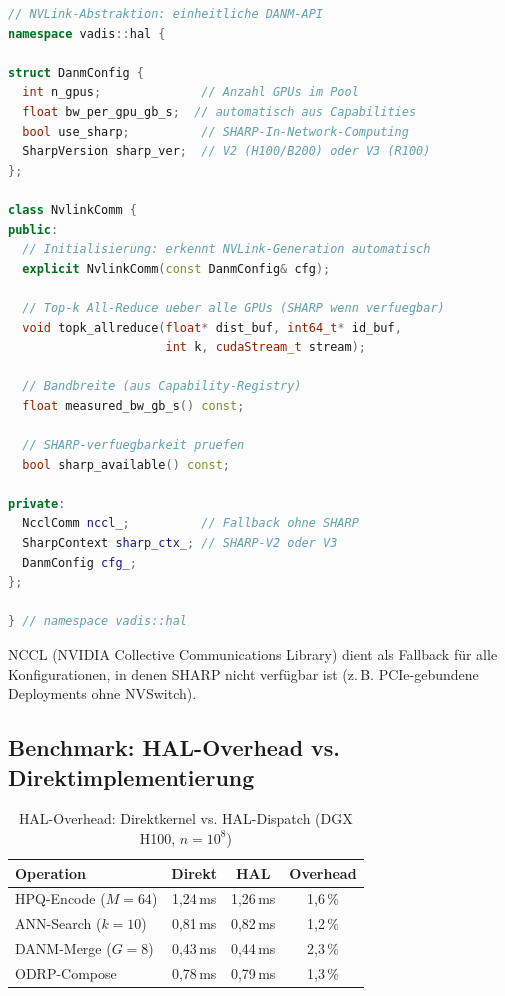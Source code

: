 ﻿\documentclass[12pt,a4paper]{article}
\begin{document}
\begin{lstlisting}[language=C++, caption={VADIS NVLink HAL-Schnittstelle}]
// NVLink-Abstraktion: einheitliche DANM-API
namespace vadis::hal {

struct DanmConfig {
  int n_gpus;              // Anzahl GPUs im Pool
  float bw_per_gpu_gb_s;  // automatisch aus Capabilities
  bool use_sharp;          // SHARP-In-Network-Computing
  SharpVersion sharp_ver;  // V2 (H100/B200) oder V3 (R100)
};

class NvlinkComm {
public:
  // Initialisierung: erkennt NVLink-Generation automatisch
  explicit NvlinkComm(const DanmConfig& cfg);
  
  // Top-k All-Reduce ueber alle GPUs (SHARP wenn verfuegbar)
  void topk_allreduce(float* dist_buf, int64_t* id_buf,
                      int k, cudaStream_t stream);
  
  // Bandbreite (aus Capability-Registry)
  float measured_bw_gb_s() const;
  
  // SHARP-verfuegbarkeit pruefen
  bool sharp_available() const;
  
private:
  NcclComm nccl_;          // Fallback ohne SHARP
  SharpContext sharp_ctx_; // SHARP-V2 oder V3
  DanmConfig cfg_;
};

} // namespace vadis::hal
\end{lstlisting}

\noindent NCCL (NVIDIA Collective Communications Library) dient
als Fallback für alle Konfigurationen, in denen SHARP nicht
verfügbar ist (z.\,B. PCIe-gebundene Deployments ohne NVSwitch).

\subsection{Benchmark: HAL-Overhead vs. Direktimplementierung}
\label{sub:hal_benchmark}

\begin{table}[ht]
\centering
\small
\caption{HAL-Overhead: Direktkernel vs. HAL-Dispatch (DGX H100, $n=10^8$)}
\label{tab:hal_overhead}
\begin{tabular}{@{}lccc@{}}
\toprule
\textbf{Operation} & \textbf{Direkt} & \textbf{HAL} & \textbf{Overhead} \\
\midrule
HPQ-Encode ($M=64$) & 1,24\,ms & 1,26\,ms & 1,6\,\% \\
ANN-Search ($k=10$) & 0,81\,ms & 0,82\,ms & 1,2\,\% \\
DANM-Merge ($G=8$) & 0,43\,ms & 0,44\,ms & 2,3\,\% \\
ODRP-Compose & 0,78\,ms & 0,79\,ms & 1,3\,\% \\
\bottomrule
\end{tabular}
\end{table}
\end{document}
